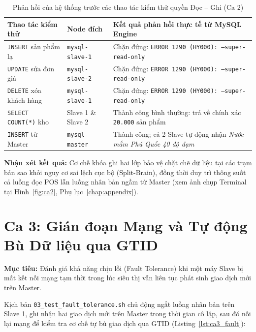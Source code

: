 \documentclass[12pt,a4paper]{report}
\begin{document}
\begin{table}[H]
\centering
\footnotesize
\caption{Phản hồi của hệ thống trước các thao tác kiểm thử quyền Đọc -- Ghi (Ca 2)}
\label{tab:ca2_results}
\vspace{0.15cm}
\begin{tabularx}{\textwidth}{L{3.5cm} L{2.8cm} Y}
\toprule
\textbf{Thao tác kiểm thử} & \textbf{Node đích} & \textbf{Kết quả phản hồi thực tế từ MySQL Engine} \\
\midrule
\texttt{INSERT} sản phẩm lạ & \texttt{mysql-slave-1} & Chặn đứng: \texttt{ERROR 1290 (HY000): --super-read-only} \\
\texttt{UPDATE} sửa đơn giá & \texttt{mysql-slave-2} & Chặn đứng: \texttt{ERROR 1290 (HY000): --super-read-only} \\
\texttt{DELETE} xóa khách hàng & \texttt{mysql-slave-1} & Chặn đứng: \texttt{ERROR 1290 (HY000): --super-read-only} \\
\texttt{SELECT COUNT(*)} kho & Slave 1 \& Slave 2 & Thành công bình thường: trả về chính xác \texttt{20.000} sản phẩm \\
\texttt{INSERT} từ Master & \texttt{mysql-master} & Thành công; cả 2 Slave tự động nhận \textit{Nước mắm Phú Quốc 40 độ đạm} \\
\bottomrule
\end{tabularx}
\end{table}

\noindent \textbf{Nhận xét kết quả:} Cơ chế khóa ghi hai lớp bảo vệ chặt chẽ dữ liệu tại các trạm bản sao khỏi nguy cơ sai lệch cục bộ (Split-Brain), đồng thời duy trì thông suốt cả luồng đọc POS lẫn luồng nhân bản ngầm từ Master (xem ảnh chụp Terminal tại Hình~\ref{fig:ca2}, Phụ lục~\ref{chap:appendix}).

\section{Ca 3: Gián đoạn Mạng và Tự động Bù Dữ liệu qua GTID}
\textbf{Mục tiêu:} Đánh giá khả năng chịu lỗi (Fault Tolerance) khi một máy Slave bị mất kết nối mạng tạm thời trong lúc siêu thị vẫn liên tục phát sinh giao dịch mới trên Master.

Kịch bản \texttt{03\_test\_fault\_tolerance.sh} chủ động ngắt luồng nhân bản trên Slave 1, ghi nhận hai giao dịch mới trên Master trong thời gian cô lập, sau đó nối lại mạng để kiểm tra cơ chế tự bù giao dịch qua GTID (Listing~\ref{lst:ca3_fault}):
\end{document}
